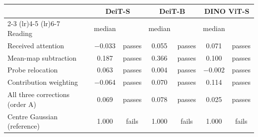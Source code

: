 \small
\setlength{\tabcolsep}{4pt}
\begin{tabular}{lcccccc}
\toprule
 & \multicolumn{2}{c}{DeiT-S} & \multicolumn{2}{c}{DeiT-B} & \multicolumn{2}{c}{DINO ViT-S} \\
\cmidrule(lr){2-3} \cmidrule(lr){4-5} \cmidrule(lr){6-7}
Reading & median & & median & & median & \\
\midrule
Received attention & $-$0.033 & passes & 0.055 & passes & 0.071 & passes \\
Mean-map subtraction & 0.187 & passes & 0.366 & passes & 0.100 & passes \\
Probe relocation & 0.063 & passes & 0.004 & passes & $-$0.002 & passes \\
Contribution weighting & $-$0.064 & passes & 0.070 & passes & 0.114 & passes \\
All three corrections (order A) & 0.069 & passes & 0.078 & passes & 0.025 & passes \\
\midrule
Centre Gaussian (reference) & 1.000 & fails & 1.000 & fails & 1.000 & fails \\
\bottomrule
\end{tabular}
